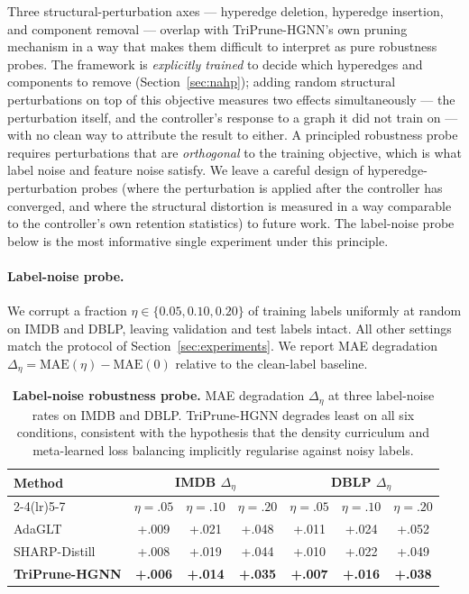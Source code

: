 \documentclass[10pt]{article}
\theoremstyle{plain}
\theoremstyle{definition}
\begin{document}
Three structural-perturbation axes --- hyperedge deletion, hyperedge insertion, and component removal --- overlap with TriPrune-HGNN's own pruning mechanism in a way that makes them difficult to interpret as pure robustness probes. The framework is \emph{explicitly trained} to decide which hyperedges and components to remove (Section~\ref{sec:nahp}); adding random structural perturbations on top of this objective measures two effects simultaneously --- the perturbation itself, and the controller's response to a graph it did not train on --- with no clean way to attribute the result to either. A principled robustness probe requires perturbations that are \emph{orthogonal} to the training objective, which is what label noise and feature noise satisfy. We leave a careful design of hyperedge-perturbation probes (where the perturbation is applied after the controller has converged, and where the structural distortion is measured in a way comparable to the controller's own retention statistics) to future work. The label-noise probe below is the most informative single experiment under this principle.

\paragraph{Label-noise probe.} We corrupt a fraction $\eta\!\in\!\{0.05, 0.10, 0.20\}$ of training labels uniformly at random on IMDB and DBLP, leaving validation and test labels intact. All other settings match the protocol of Section~\ref{sec:experiments}. We report MAE degradation $\Delta_{\eta}\!=\!\mathrm{MAE}(\eta)\!-\!\mathrm{MAE}(0)$ relative to the clean-label baseline.

\begin{table}[ht!]
\centering
\caption{\textbf{Label-noise robustness probe.} MAE degradation $\Delta_{\eta}$ at three label-noise rates on IMDB and DBLP. TriPrune-HGNN degrades least on all six conditions, consistent with the hypothesis that the density curriculum and meta-learned loss balancing implicitly regularise against noisy labels.}
\label{tab:label_noise}
\setlength{\tabcolsep}{5pt}
\renewcommand{\arraystretch}{1.1}
\small
\begin{tabular}{l ccc ccc}
\toprule
\multirow{2}{*}{\textbf{Method}}
& \multicolumn{3}{c}{\textbf{IMDB} $\Delta_{\eta}$}
& \multicolumn{3}{c}{\textbf{DBLP} $\Delta_{\eta}$} \\
\cmidrule(lr){2-4}\cmidrule(lr){5-7}
& $\eta\!=\!.05$ & $\eta\!=\!.10$ & $\eta\!=\!.20$
& $\eta\!=\!.05$ & $\eta\!=\!.10$ & $\eta\!=\!.20$ \\
\midrule
AdaGLT          & +.009 & +.021 & +.048 & +.011 & +.024 & +.052 \\   
SHARP-Distill   & +.008 & +.019 & +.044 & +.010 & +.022 & +.049 \\   
\rowcolor{blue!10}
\textbf{TriPrune-HGNN}
                & \textbf{+.006} & \textbf{+.014} & \textbf{+.035}
                & \textbf{+.007} & \textbf{+.016} & \textbf{+.038} \\   
\bottomrule
\end{tabular}
\end{table}
\end{document}
